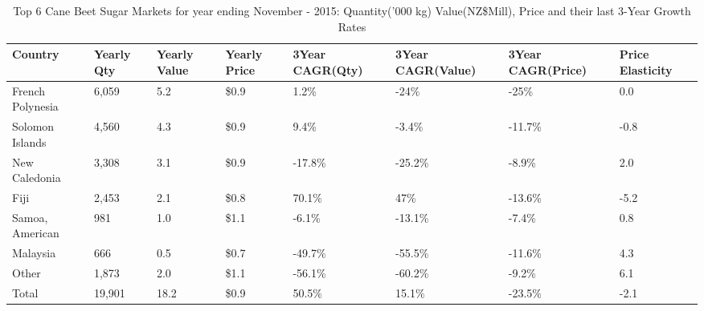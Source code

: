 \begin{table}[ht]
\centering
{\scriptsize
\begin{tabular}[t]{p{1.8cm}>{\hfill}p{1.4cm}>{\hfill}p{1.4cm}>{\hfill}p{1.6cm}>{\hfill}p{1.9cm}>{\hfill}p{2cm}>{\hfill}p{1.9cm}>{\hfill}p{1.5cm}}
 \textbf{Country} & \textbf{Yearly Qty} & \textbf{Yearly Value} & \textbf{Yearly Price} & \textbf{3Year CAGR(Qty)} & \textbf{3Year CAGR(Value)} & \textbf{3Year CAGR(Price)} & \textbf{Price Elasticity} \\
\hline
French Polynesia & 6,059 & 5.2 & \$0.9 & 1.2\% & -24\% & -25\% & 0.0 \\  
Solomon Islands & 4,560 & 4.3 & \$0.9 & 9.4\% & -3.4\% & -11.7\% & -0.8 \\  
New Caledonia & 3,308 & 3.1 & \$0.9 & -17.8\% & -25.2\% & -8.9\% & 2.0 \\  
Fiji & 2,453 & 2.1 & \$0.8 & 70.1\% & 47\% & -13.6\% & -5.2 \\  
Samoa, American & 981 & 1.0 & \$1.1 & -6.1\% & -13.1\% & -7.4\% & 0.8 \\  
Malaysia & 666 & 0.5 & \$0.7 & -49.7\% & -55.5\% & -11.6\% & 4.3 \\  
Other & 1,873 & 2.0 & \$1.1 & -56.1\% & -60.2\% & -9.2\% & 6.1 \\  
Total & 19,901 & 18.2 & \$0.9 & 50.5\% & 15.1\% & -23.5\% & -2.1 \\  
\hline
\end{tabular}
}
\caption{\scriptsize Top 6 Cane Beet Sugar Markets for year ending November - 2015: Quantity('000 kg) Value(NZ\$Mill), Price and their last 3-Year Growth Rates}
\end{table}


